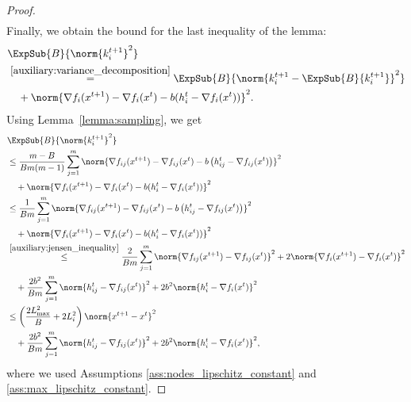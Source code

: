 \documentclass{article}
\begin{document}
\begin{proof}
\begin{align*}
  \end{align*}
  Finally, we obtain the bound for the last inequality of the lemma:
  \begin{align*}
    &\ExpSub{B}{\norm{k^{t+1}_i}^2}\\
    &\overset{\eqref{auxiliary:variance_decomposition}}{=}\ExpSub{B}{\norm{k^{t+1}_i - \ExpSub{B}{k^{t+1}_i}}^2}\\
    &\quad + \norm{\nabla f_i(x^{t+1}) - \nabla f_i(x^{t}) - b(h^t_i - \nabla f_i(x^{t}))}^2.
  \end{align*}
  Using Lemma~\ref{lemma:sampling}, we get
  \begin{align*}
    &\ExpSub{B}{\norm{k^{t+1}_i}^2}\\
    &\leq\frac{m - B}{B m (m - 1)}\sum_{j=1}^m\norm{\nabla f_{ij}(x^{t+1}) - \nabla f_{ij}(x^{t}) - b \left(h^t_{ij} - \nabla f_{ij}(x^{t})\right)}^2\\
    &\quad + \norm{\nabla f_i(x^{t+1}) - \nabla f_i(x^{t}) - b(h^t_i - \nabla f_i(x^{t}))}^2 \\
    &\leq\frac{1}{B m}\sum_{j=1}^m\norm{\nabla f_{ij}(x^{t+1}) - \nabla f_{ij}(x^{t}) - b \left(h^t_{ij} - \nabla f_{ij}(x^{t})\right)}^2\\
    &\quad + \norm{\nabla f_i(x^{t+1}) - \nabla f_i(x^{t}) - b(h^t_i - \nabla f_i(x^{t}))}^2 \\
    &\overset{\eqref{auxiliary:jensen_inequality}}{\leq}\frac{2}{B m}\sum_{j=1}^m\norm{\nabla f_{ij}(x^{t+1}) - \nabla f_{ij}(x^{t})}^2 + 2 \norm{\nabla f_i(x^{t+1}) - \nabla f_i(x^{t})}^2\\
    &\quad + \frac{2 b^2}{B m}\sum_{j=1}^m\norm{h^t_{ij} - \nabla f_{ij}(x^{t})}^2 + 2 b^2 \norm{h^t_i - \nabla f_i(x^{t})}^2 \\
    &\leq\left(\frac{2 L_{\max}^2}{B} + 2 L_i^2\right)\norm{x^{t+1} - x^{t}}^2 \\
    &\quad + \frac{2 b^2}{B m}\sum_{j=1}^m\norm{h^t_{ij} - \nabla f_{ij}(x^{t})}^2 + 2 b^2 \norm{h^t_i - \nabla f_i(x^{t})}^2,
  \end{align*}
  where we used Assumptions \ref{ass:nodes_lipschitz_constant} and \ref{ass:max_lipschitz_constant}.
\end{proof}
\end{document}
